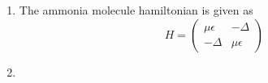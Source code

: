 \begin{sol}
\begin{enumerate}[label=\textbf{(\alph*)}]
    \item The ammonia molecule hamiltonian is given as \[H=\begin{pmatrix}
        \mu\epsilon&-\Delta\\
        -\Delta&\mu\epsilon
    \end{pmatrix}\] 
    
    \item 

\end{enumerate}
\end{sol}